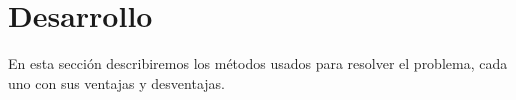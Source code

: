 \section{Desarrollo}
En esta sección describiremos los métodos usados para resolver el problema, cada uno con sus
ventajas y desventajas.


